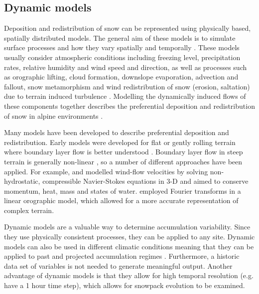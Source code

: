 \documentclass{sfuthesis}
\begin{document}
\subsection{Dynamic models}
Deposition and redistribution of snow can be represented using physically based, spatially distributed models. The general aim of these models is to simulate surface processes and how they vary spatially and temporally \citep{Mott2008}. These models usually consider atmospheric conditions including freezing level, precipitation rates, relative humidity and wind speed and direction, as well as processes such as orographic lifting, cloud formation, downslope evaporation, advection and fallout, snow metamorphism and wind redistribution of snow (erosion, saltation) due to terrain induced turbulence \citep{Smith2004, Liston2006, Lehning2008, Mott2008}.  Modelling the dynamically induced flows of these components together describes the preferential deposition and redistribution of snow in alpine environments \citep{Lehning2008,Mott2008,Dadic2010}.

Many models have been developed to describe preferential deposition and redistribution. Early models were developed for flat or gently rolling terrain where boundary layer flow is better understood \citep{Dadic2010}. Boundary layer flow in steep terrain is generally non-linear \citep{Mott2008, Dadic2010}, so a number of different approaches have been applied.  For example, \cite{Dadic2010} and \citep{Lehning2008}modelled wind-flow velocities by solving non-hydrostatic, compressible Navier-Stokes equations in 3-D and aimed to conserve momentum, heat, mass and states of water. \cite{Smith2004} employed Fourier transforms in a linear orographic model, which allowed for a more accurate representation of complex terrain. 

Dynamic models are a valuable way to determine accumulation variability. Since they use physically consistent processes, they can be applied to any site. Dynamic models can also be used in different climatic conditions meaning that they can be applied to past and projected accumulation regimes \citep{Clark2011}. Furthermore, a historic data set of variables is not needed to generate meaningful output. Another advantage of dynamic models is that they allow for high temporal resolution (e.g. \cite{Mott2008} have a 1 hour time step), which allows for snowpack evolution to be examined.
\end{document}
